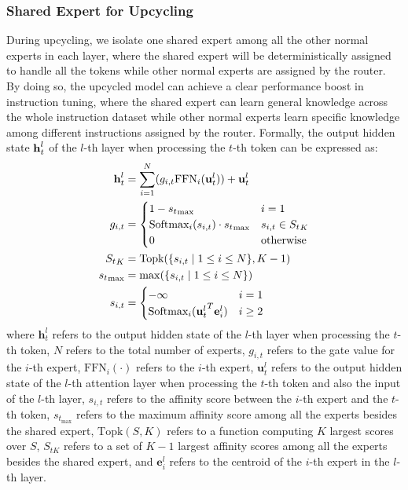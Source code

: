 \subsubsection{Shared Expert for Upcycling}
During upcycling, we isolate one shared expert among all the other normal experts in each \moe layer, where the shared expert will be deterministically assigned to handle all the tokens while other normal experts are assigned by the router. By doing so, the upcycled \moe model can achieve a clear performance boost in instruction tuning, where the shared expert can learn general knowledge across the whole instruction dataset while other normal experts learn specific knowledge among different instructions assigned by the router. Formally, the output hidden state $\mbox{\textbf{h}}_t^l$ of the $l$-th \moe layer when processing the $t$-th token can be expressed as:
\begin{equation}\label{formula:upcycling}
\begin{split}
\mbox{\textbf{h}}_t^l &= \sum_{i=1}^{N}(g_{i,t}\mbox{FFN}_i(\mbox{\textbf{u}}_t^l)) + \mbox{\textbf{u}}_t^l \\
g_{i,t} &= 
\begin{cases}
 1-{s_{t}}_{\max} & i=1 \\
 \mbox{Softmax}_i(s_{i,t})\cdot {s_{t}}_{\max} & s_{i,t}\in  {S_t}_K \\
    0 & {\text{otherwise}}
\end{cases} \\
{S_t}_K &= \mbox{Topk}(\{s_{i,t} \mid 1\leq i\leq N\}, K-1) \\
{s_{t}}_{\max} &= \max (\{s_{i,t} \mid 1\leq i\leq N\}) \\
s_{i,t} &= \begin{cases}
    -\infty & i = 1 \\
 \mbox{Softmax}_i({\mbox{\textbf{u}}_t^l}^T\mbox{\textbf{e}}_i^l)& i\geq 2
\end{cases} \\
\end{split}
\end{equation}
where $\textbf{h}_t^l$ refers to the output hidden state of the $l$-th \moe layer when processing the $t$-th token, $N$ refers to the total number of experts, $g_{i,t}$ refers to the gate value for the $i$-th expert, $\mbox{FFN}_i(\cdot)$ refers to the $i$-th expert, $\textbf{u}_t^l$ refers to the output hidden state of the $l$-th attention layer when processing the $t$-th token and also the input of the $l$-th \moe layer, $s_{i, t}$ refers to the affinity score between the $i$-th expert and the $t$-th token, $s_{t_{\max}}$ refers to the maximum affinity score among all the experts besides the shared expert, $\mbox{Topk}(S,K)$ refers to a function computing $K$ largest scores over $S$, $S_{tK}$ refers to a set of $K-1$ largest affinity scores among all the experts besides the shared expert, and $\textbf{e}_i^l$ refers to the centroid of the $i$-th expert in the $l$-th \moe layer.

